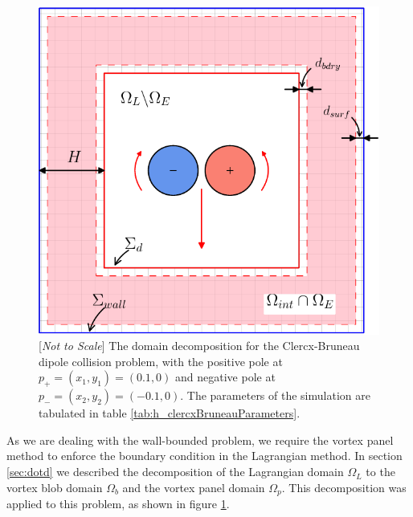 	\begin{figure}[!h]
	\showthe\columnwidth
	\centering
	\includegraphics[width=0.5\linewidth]{./figures/hybrid/cbColl/hcbdc_dd-crop.pdf}
	\caption{[\textit{Not to Scale}] The domain decomposition for the Clercx-Bruneau dipole collision problem, with the positive pole at $p_{+}=(x_1,y_1) = (0.1,0)$ and negative pole at $p_{-}=(x_2,y_2)=(-0.1,0)$. The parameters of the simulation are tabulated in table \ref{tab:h_clercxBruneauParameters}.}
	\label{fig:hcbdc_dd}
	\end{figure}

As we are dealing with the wall-bounded problem, we require the vortex panel method to enforce the boundary condition in the Lagrangian method. In section \ref{sec:dotd} we described the decomposition of the Lagrangian domain $\Omega_L$ to the vortex blob domain $\Omega_b$ and the vortex panel domain $\Omega_p$. This decomposition was applied to this problem, as shown in figure \ref{fig:hcbdc_dd}.

